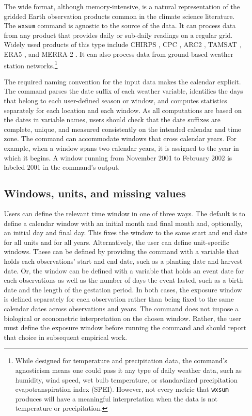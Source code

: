 The wide format, although memory-intensive, is a natural representation of the gridded Earth observation products common in the climate science literature. The \texttt{wxsum} command is agnostic to the source of the data. It can process data from any product that provides daily or sub-daily readings on a regular grid. Widely used products of this type include CHIRPS \citep{CHIRPS}, CPC \citep{CPC08}, ARC2 \citep{ARC2}, TAMSAT \citep{TAMSAT}, ERA5 \citep{ERA5}, and MERRA-2 \citep{MERRA2}. It can also process data from ground-based weather station networks.\footnote{While designed for temperature and precipitation data, the command's agnosticism means one could pass it any type of daily weather data, such as humidity, wind speed, wet bulb temperature, or standardized precipitation evapotranspiration index (SPEI). However, not every metric that \texttt{wxsum} produces will have a meaningful interpretation when the data is not temperature or precipitation.}

The required naming convention for the input data makes the calendar explicit. The command parses the date suffix of each weather variable, identifies the days that belong to each user-defined season or window, and computes statistics separately for each location and each window. As all computations are based on the dates in variable names, users should check that the date suffixes are complete, unique, and measured consistently on the intended calendar and time zone. The command can accommodate windows that cross calendar years. For example, when a window spans two calendar years, it is assigned to the year in which it begins. A window running from November 2001 to February 2002 is labeled 2001 in the command's output.

\subsection{Windows, units, and missing values}

Users can define the relevant time window in one of three ways. The default is to define a calendar window with an initial month and final month and, optionally, an initial day and final day. This fixes the window to the same start and end date for all units and for all years. Alternatively, the user can define unit-specific windows. These can be defined by providing the command with a variable that holds each observations' start and end date, such as a planting date and harvest date. Or, the window can be defined with a variable that holds an event date for each observations as well as the number of days the event lasted, such as a birth date and the length of the gestation period. In both cases, the exposure window is defined separately for each observation rather than being fixed to the same calendar dates across observations and years. The command does not impose a biological or econometric interpretation on the chosen window. Rather, the user must define the exposure window before running the command and should report that choice in subsequent empirical work.

